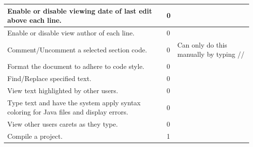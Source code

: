 \documentclass[twoside,letterpaper]{article}
\begin{document}
\newpage
\begin{tabular}{|p{6cm}|p{2.5cm}|p{8cm}|}
 \hline
Enable or disable viewing date of last edit above each line.                           & 0                     &                                                                                                                          \\ \hline
Enable or disable view author of each line.                                            & 0                     &                                                                                                                          \\ \hline
Comment/Uncomment a selected section code.                                             & 0                     & Can only do this manually by typing //                                                                                   \\ \hline
Format the document to adhere to code style.                                           & 0                     &                                                                                                                          \\ \hline
Find/Replace specified text.                                                           & 0                     &                                                                                                                          \\ \hline
View text highlighted by other users.                                                  & 0                     &                                                                                                                          \\ \hline
Type text and have the system apply syntax coloring for Java files and display errors. & 0                     &                                                                                                                          \\ \hline
View other users carets as they type.                                                 & 0                     &                                                                                                                          \\ \hline
Compile a project.                                                                     & 1                     &                                                                                                                          \\ \hline

\end{tabular}
\end{document}
